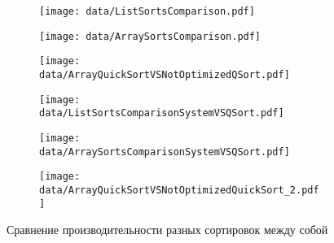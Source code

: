 \begin{figure}[H]
	\centering
	\begin{subfigure}[b]{0.40\textwidth}
       \centering
	   \texttt{[image: data/ListSortsComparison.pdf]}
	   \label{fig:ListSortsComparison}
	\end{subfigure}
	\begin{subfigure}[b]{0.40\textwidth}
       \centering
	   \texttt{[image: data/ArraySortsComparison.pdf]}
	   \label{fig:ArraySortsComparison}
	\end{subfigure}
	\begin{subfigure}[b]{0.40\textwidth}
       \centering
	   \texttt{[image: data/ArrayQuickSortVSNotOptimizedQSort.pdf]}
	   \label{fig:ArrayQuickSortVSNotOptimizedQSort}
	\end{subfigure}
	\begin{subfigure}[b]{0.40\textwidth}
       \centering
	   \texttt{[image: data/ListSortsComparisonSystemVSQSort.pdf]}
	   \label{fig:ListSortsComparisonSystemVSQSort}
	\end{subfigure}
	\begin{subfigure}[b]{0.40\textwidth}
       \centering
	   \texttt{[image: data/ArraySortsComparisonSystemVSQSort.pdf]}
	   \label{fig:ArraySortsComparisonSystemVSQSort}
	\end{subfigure}
	\begin{subfigure}[b]{0.40\textwidth}
       \centering
	   \texttt{[image: data/ArrayQuickSortVSNotOptimizedQuickSort\_2.pdf]}
	   \label{fig:ArraySortsComparisonSystemVSQSort}
	\end{subfigure}
	\caption{Сравнение производительности разных сортировок между собой}
	\label{fig:SortsComparison}	
\end{figure}



